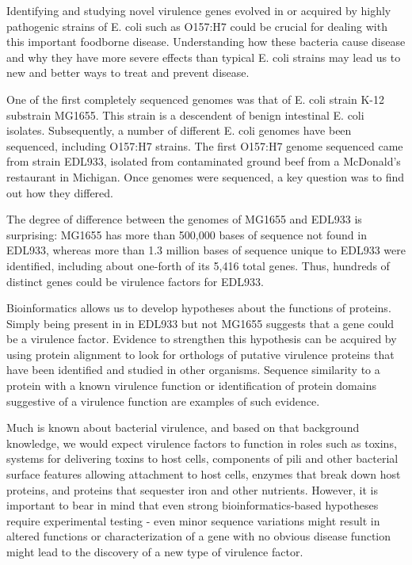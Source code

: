 Identifying and studying novel virulence genes evolved in or acquired by highly pathogenic strains of E. coli such as O157:H7 could be crucial for dealing with this important foodborne disease.  Understanding how these bacteria cause disease and why they have more severe effects than typical E. coli strains may lead us to new and better ways to treat and prevent disease.  

One of the first completely sequenced genomes was that of E. coli strain K-12 substrain MG1655.  This strain is a descendent of benign intestinal E. coli isolates.  Subsequently, a number of different E. coli genomes have been sequenced, including O157:H7 strains.  The first O157:H7 genome sequenced came from strain EDL933, isolated from contaminated ground beef from a McDonald's restaurant in Michigan.  Once genomes were sequenced, a key question was to find out how they differed.  

The degree of difference between the genomes of MG1655 and EDL933 is surprising:  MG1655 has more than 500,000 bases of sequence not found in EDL933, whereas more than 1.3 million bases of sequence unique to EDL933 were identified, including about one-forth of its 5,416 total genes.  Thus, hundreds of distinct genes could be virulence factors for EDL933.

Bioinformatics allows us to develop hypotheses about the functions of proteins.  Simply being present in in EDL933 but not MG1655 suggests that a gene could be a virulence factor.  Evidence to strengthen this hypothesis can be acquired by using protein alignment to look for orthologs of putative virulence proteins that have been identified and studied in other organisms.  Sequence similarity to a protein with a known virulence function or identification of protein domains suggestive of a virulence function are examples of such evidence.  

Much is known about bacterial virulence, and based on that background knowledge, we would expect virulence factors to function in roles such as toxins, systems for delivering toxins to host cells, components of pili and other bacterial surface features allowing attachment to host cells, enzymes that break down host proteins, and proteins that sequester iron and other nutrients.  However, it is important to bear in mind that even strong bioinformatics-based hypotheses require experimental testing - even minor sequence variations might result in altered functions or characterization of a gene with no obvious disease function might lead to the discovery of a new type of virulence factor.

